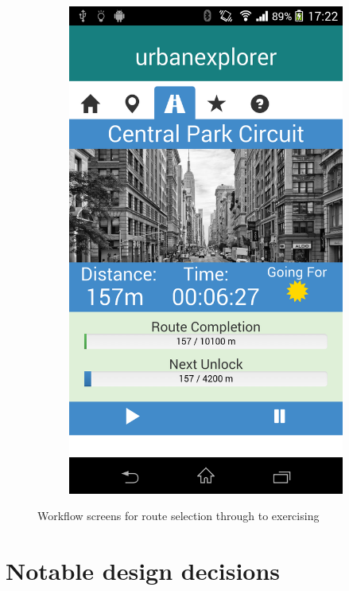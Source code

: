 \begin{figure}[h]
\begin{subfigure}[b]{0.3\textwidth}
    \includegraphics[width=\textwidth]{images/screens/run.png}
  \end{subfigure}
  \caption{Workflow screens for route selection through to exercising}
  \label{fig:route-exercise}
\end{figure}

\section{Notable design decisions}\label{sec:notable}
